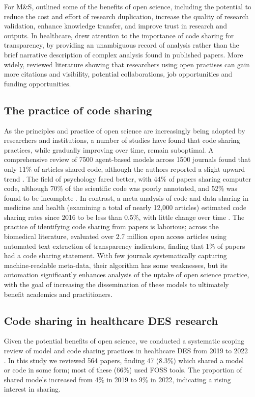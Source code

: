 \documentclass[]{interact}
\theoremstyle{plain}%
\theoremstyle{definition}
\theoremstyle{remark}
\begin{document}
For M\&S, \cite{taylor2017open} outlined some of the benefits of open science, including the potential to reduce the cost and effort of research duplication, increase the quality of research validation, enhance knowledge transfer, and improve trust in research and outputs. In healthcare, \cite{goldacre2019researchers} drew attention to the importance of code sharing for transparency, by providing an unambiguous record of analysis rather than the brief narrative description of complex analysis found in published papers. More widely, \cite{mckiernan2016open} reviewed literature showing that researchers using open practises can gain more citations and visibility, potential collaborations, job opportunities and funding opportunities. 

\subsection{The practice of code sharing}

As the principles and practice of open science are increasingly being adopted by researchers and institutions, a number of studies have found that code sharing practices, while gradually improving over time, remain suboptimal. A comprehensive review of 7500 agent-based models across 1500 journals found that only 11\% of articles shared code, although the authors reported a slight upward trend \citep{janssen2020code}. The field of psychology fared better, with 44\% of papers sharing computer code, although 70\% of the scientific code was poorly annotated, and 52\% was found to be incomplete \citep{kucharsky2020code}. 
In contrast, a meta-analysis of code and data sharing in medicine and health (examining a total of nearly 12,000 articles) estimated code sharing rates since 2016 to be less than 0.5\%, with little change over time \citep{hamilton2023prevalence}. The practice of identifying code sharing from papers is laborious; across the biomedical literature, \cite{serghiou2021assessment} evaluated over 2.7 million open access articles using automated text extraction of transparency indicators, finding that 1\% of papers had a code sharing statement. With few journals systematically capturing machine-readable meta-data, their algorithm has some weaknesses, but its automation significantly enhances analysis of the uptake of open science practice, with the goal of increasing the dissemination of these models to ultimately benefit academics and practitioners. 

\subsection{Code sharing in healthcare DES research}
Given the potential benefits of open science, we conducted a systematic scoping review of model and code sharing practices in healthcare DES from 2019 to 2022 \citep{monks2023computer}. In this study we reviewed 564 papers, finding 47 (8.3\%) which shared a model or code in some form; most of these (66\%) used FOSS tools. The proportion of shared models increased from 4\% in 2019 to 9\% in 2022, indicating a rising interest in sharing. 
\end{document}
